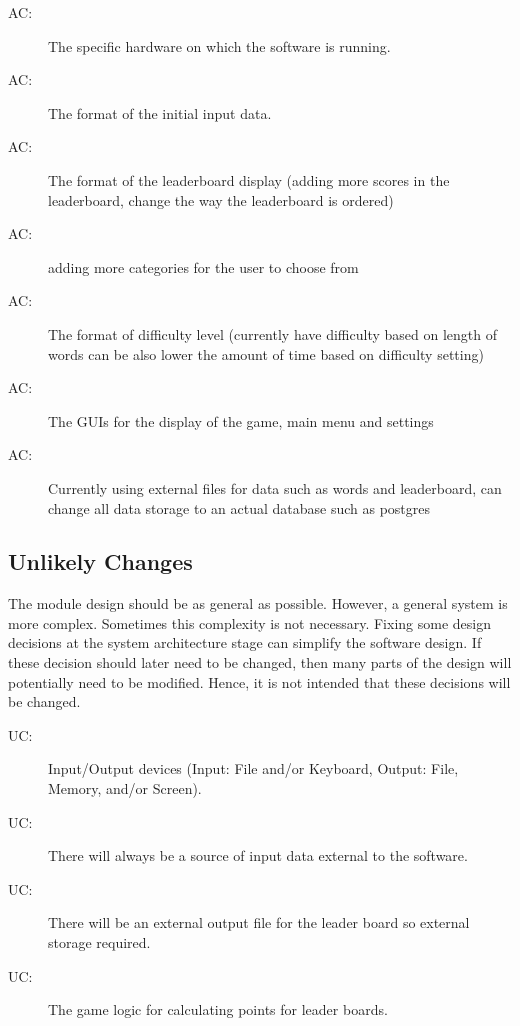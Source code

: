 \documentclass[12pt, titlepage]{article}
\newcounter{acnum}
\newcommand{\actheacnum}{AC\theacnum}
\newcounter{ucnum}
\newcommand{\uctheucnum}{UC\theucnum}
\begin{document}
\begin{description}
\item[ \actheacnum \label{acHardware}:] The specific
  hardware on which the software is running.
\item[ \actheacnum \label{acInput}:] The format of the
  initial input data.
\item[ \actheacnum \label{acInput}:] The format of the leaderboard display (adding more scores in the leaderboard, change the way the leaderboard is ordered)
\item[ \actheacnum \label{acInput}:] adding more categories for the user to choose from
\item[ \actheacnum \label{acInput}:] The format of difficulty level (currently have difficulty based on length of words can be also lower the amount of time based on difficulty setting)
\item[ \actheacnum \label{acInput}:] The GUIs for the display of the game, main menu and settings
\item[ \actheacnum \label{acInput}:] Currently using external files for data such as words and leaderboard, can change all data storage to an actual database such as postgres
\end{description}

\subsection{Unlikely Changes} \label{SecUchange}

The module design should be as general as possible. However, a general system is
more complex. Sometimes this complexity is not necessary. Fixing some design
decisions at the system architecture stage can simplify the software design. If
these decision should later need to be changed, then many parts of the design
will potentially need to be modified. Hence, it is not intended that these
decisions will be changed.

\begin{description}
\item[ \uctheucnum \label{ucIO}:] Input/Output devices
  (Input: File and/or Keyboard, Output: File, Memory, and/or Screen).
\item[ \uctheucnum \label{ucInput}:] There will always be
  a source of input data external to the software.
\item[ \uctheucnum \label{ucInput}:] There will be an external output file for the leader board so external storage required.
\item[ \uctheucnum \label{ucInput}:] The game logic for calculating points for leader boards.
\end{description}
\end{document}
